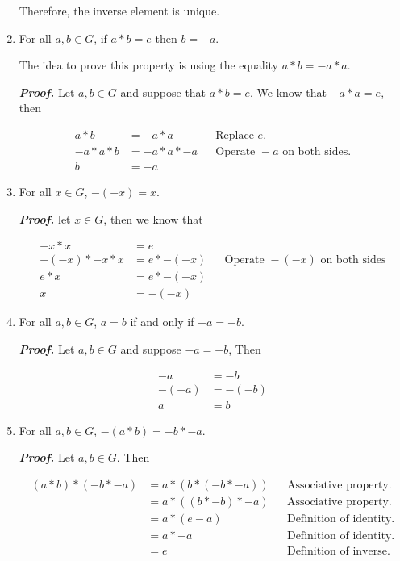 \documentclass{report}
\begin{document}
\begin{enumerate}
        Therefore, the inverse element is unique.

        \item For all $a,b \in G$, if $a*b = e$ then $b=-a$.

        \begin{ideaBox}
            The idea to prove this property is using the equality $a*b = -a*a$.
        \end{ideaBox}

        \textit{\textbf{Proof.}} Let $a,b \in G$ and suppose that $a*b = e$. We know that $-a * a = e$, then

        \begin{align*}
            a*b &= -a*a &&\text{Replace }e.\\
            -a * a * b &= -a * a * -a &&\text{Operate } -a \text{ on both sides.}\\
            b&=-a
        \end{align*}

        \item For all $x \in G$, $-(-x) = x$.

        \textit{\textbf{Proof.}} let $x \in G$, then we know that

        \begin{align*}
            -x*x &= e\\
            -(-x) * -x*x &= e * -(-x) &&\text{Operate } -(-x) \text{ on both sides}\\
            e*x &= e* -(-x)\\
            x &= -(-x)
        \end{align*}

        \item For all $a,b \in G$, $a=b$ if and only if $-a = -b$.

        \textit{\textbf{Proof.}} Let $a, b \in G$ and suppose $-a = -b$, Then

        \begin{align*}
            -a &= -b \\
            -(-a) &= -(-b)\\
            a &= b
        \end{align*}

        \item For all $a, b \in G$, $-(a*b) = -b*-a$.

        \textit{\textbf{Proof.}} Let $a,b \in G$. Then

        \begin{align*}
            (a*b) * (-b*-a) &= a*(b*(-b*-a)) &&\text{Associative property.}\\
            &= a*((b*-b)*-a) &&\text{Associative property.}\\
            &= a*(e - a) &&\text{Definition of identity.}\\
            &= a*-a &&\text{Definition of identity.}\\
            &= e &&\text{Definition of inverse.}
        \end{align*}


\end{enumerate}
\end{document}
